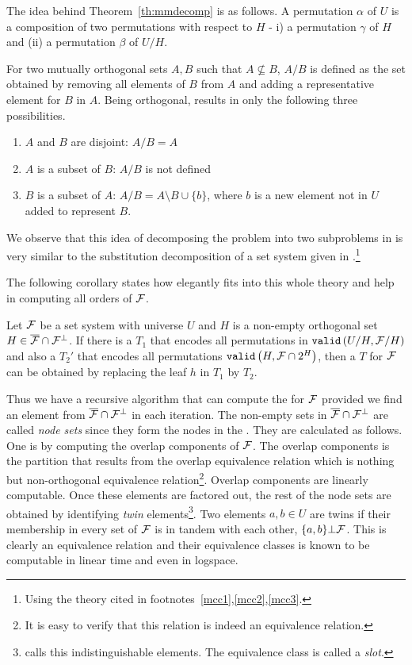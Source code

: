 The idea behind Theorem~\ref{th:mmdecomp} is as follows. A permutation $\alpha$
of $U$ is a composition of two permutations with respect to $H$ - i) a
permutation $\gamma$ of $H$ and (ii) a permutation $\beta$ of $U/H$.

For two mutually orthogonal sets $A, B$ such that $A \nsubseteq B$,
$A/B$ is defined as the set obtained by removing all elements of $B$
from $A$ and adding a representative element for $B$ in $A$. Being orthogonal,
results in only the following three possibilities.
\begin{enumerate}
\item $A$ and $ B$ are disjoint: $A/B  = A$
\item $A$ is a subset of $B$: $A/B$ is not defined
\item $B$ is a subset of $A$: $A/B = A \setminus B \cup \{b\}$, where $b$
is a new element not in $U$ added to represent $B$.
\end{enumerate}

We observe that this idea of decomposing the \COP problem into two
subproblems in \cite{mm96} is very similar to the substitution
decomposition of a set system given in \cite[Sec.~4]{mcc04}.\footnote{Using
  the theory cited in footnotes~\ref{mcc1},\ref{mcc2},\ref{mcc3}.}

The following corollary states how \PQRtree elegantly fits into this
whole theory and help in computing all \COP orders of ${\cal F}$.

\begin{corollary}[{\cite[Cor.~8]{mm96}}]
  Let ${\cal F}$ be a set system with universe $U$ and $H$ is a non-empty
  orthogonal set $H \in
  \overline{{\cal F}} \cap {\cal F}^{\bot}$. If there is a \PQRtree $T_1$ that encodes all permutations in
  ${\tt valid}\left(U/H, {\cal F}/H\right)$ and also a \PQRtree $T_2'$ that encodes all
  permutations ${\tt valid}\left(H,{\cal F} \cap 2^{H}\right)$, then a \PQRtree $T$ for
  ${\cal F}$ can be obtained by replacing the leaf $h$ in $T_1$ by $T_2$.
\end{corollary}


Thus we have a recursive algorithm that can compute the \PQRtree for
${\cal F}$ provided we find an element from $\overline{{\cal F}} \cap {\cal F}^{\bot}$ in each iteration. The
non-empty sets in $\overline{{\cal F}} \cap {\cal F}^{\bot}$ are called {\em node sets} since they form the
nodes in the \PQRtree. They are calculated as follows.  One is by
computing the overlap components of ${\cal F}$. The overlap components is
the partition that results from the {overlap} equivalence relation
which is nothing but non-orthogonal equivalence relation\footnote{It
  is easy to verify that this relation is indeed an equivalence
  relation.}. Overlap components are linearly
computable\cite{mm95,wlh92}. Once these elements are factored
out, the rest of the node sets are obtained by identifying {\em twin}
elements\footnote{\cite[Sec.~3]{kklv10} calls this {indistinguishable}
  elements. The equivalence class is called a {\em slot}.}. Two
elements $a, b \in U$ are twins if their membership in every set of
${\cal F}$ is in tandem with each other, \ie $\{a,b\} \bot {\cal F}$. This is
clearly an equivalence relation and their equivalence classes is known
to be computable in linear time\cite{wlh01,mm96-ref11} and even in
logspace\cite{kklv10}.

